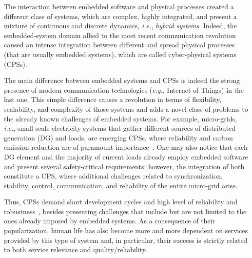 \documentclass{acm_sen_article}
\begin{document}
The interaction between embedded software and physical processes created a different class of systems, which are complex, highly integrated, and present a mixture of continuous and discrete dynamics, {\it i.e.}, \textit{hybrid systems}. Indeed, the embedded-system domain allied to the most recent communication revolution caused an intense integration between different and spread physical processes (that are usually embedded systems), which are called cyber-physical systems (CPSs). 

The main difference between embedded systems and CPSs is indeed the strong presence of modern communication technologies ({\it e.g.}, Internet of Things) in the last one. This simple difference causes a revolution in terms of flexibility, scalability, and complexity of those systems and adds a novel class of problems to the already known challenges of embedded systems. For example, micro-grids, {\it i.e.}, small-scale electricity systems that gather different sources of distributed generation (DG) and loads, are emerging CPSs, where reliability and carbon emission reduction are of paramount importance~\cite{xu15}. One may also notice that each DG element and the majority of current loads already employ embedded software and present several safety-critical requirements; however, the integration of both constitute a CPS, where additional challenges related to synchronization, stability, control, communication, and reliability of the entire micro-grid arise.

Thus, CPSs demand short development cycles and high level of reliability and robustness~\cite{leeCPS,leeCPS2}, besides presenting challenges that include but are not limited to the ones already imposed by embedded systems. As a consequence of their popularization, human life has also become more and more dependent on services provided by this type of system and, in particular, their success is strictly related to both service relevance and quality/reliability. 
\end{document}
